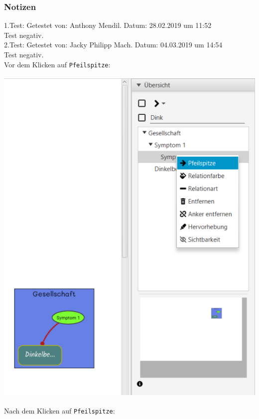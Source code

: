 \documentclass[enabledeprecatedfontcommands]{scrartcl}
\begin{document}
\subsubsection{Notizen}
1.Test: Getestet von: Anthony Mendil. Datum: 28.02.2019 um 11:52 \\
Test negativ.\\
2.Test: Getestet von: Jacky Philipp Mach. Datum: 04.03.2019 um 14:54 \\
Test negativ.\\
\newpage
Vor dem Klicken auf \texttt{Pfeilspitze}:
\begin{center}
\includegraphics[height=17cm]{relationArtVorher.PNG}
\end{center}
\newpage
Nach dem Klicken auf \texttt{Pfeilspitze}: 
\end{document}
